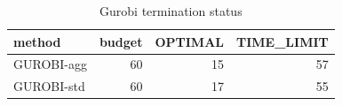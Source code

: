 \begin{table}[htbp]
\centering
\small
\caption{Gurobi termination status}
\label{tab:E4b_equal_budgets_60s_gurobi_status}
\begin{tabular}{lrrr}
\toprule
method & budget & OPTIMAL & TIME\_LIMIT \\
\midrule
GUROBI-agg & 60 & 15 & 57 \\
GUROBI-std & 60 & 17 & 55 \\
\bottomrule
\end{tabular}
\end{table}
